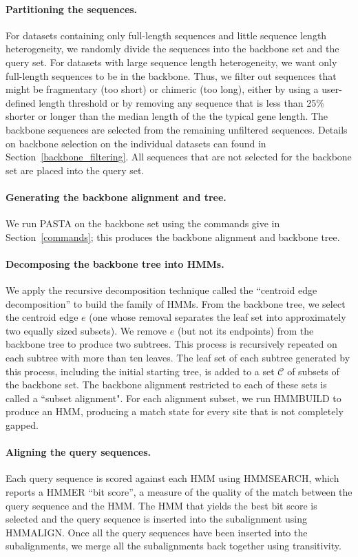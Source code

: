 \paragraph{Partitioning the sequences.}  For datasets containing only full-length sequences and little sequence length heterogeneity, we randomly divide the sequences into the backbone set and the query set.  For datasets with large sequence length heterogeneity, we want only full-length sequences to be in the backbone.  Thus, we filter out sequences that might be fragmentary (too short) or chimeric (too long), either by 
using a user-defined length threshold or by removing any sequence that 
is less than 25\% shorter or  longer than the median length of the the typical gene length.  The backbone sequences are selected from the remaining unfiltered sequences.  Details on backbone selection on the individual datasets can found in Section~\ref{backbone_filtering}.  All sequences that are not selected for the backbone set are placed into the query set.  

\paragraph{Generating the backbone alignment and tree.}  
We run PASTA on the backbone set using 
the commands give in Section~\ref{commands}; this produces the backbone alignment and backbone tree.  

\paragraph{Decomposing the backbone tree into HMMs.}  
We apply the recursive decomposition technique called the 
``centroid edge decomposition'' \cite{Liu2012} 
to build the family of HMMs.  
From the backbone tree, we select the centroid edge $e$ 
(one whose removal separates the leaf set into 
approximately two equally 
sized subsets).
We remove $e$ (but not its endpoints) from 
the backbone tree  to produce two subtrees.  
This process is recursively repeated on each subtree with
more than ten leaves.
The leaf set of each subtree generated by this process, 
including the initial starting tree, 
is added to a set $\mathcal C$ of subsets of the backbone set.
The backbone alignment restricted to each of these sets is
called a ``subset alignment".
 For each alignment subset, we run HMMBUILD to produce an HMM, producing a match state for every site that is not completely gapped.

\paragraph{Aligning the query sequences.}  Each query sequence is scored against each HMM using HMMSEARCH, which reports a HMMER ``bit score'', a measure of the quality of the match between the query sequence and the HMM.  The HMM that yields the best bit score is selected and the query sequence is inserted into the subalignment using HMMALIGN.  Once all the query sequences have been inserted into the subalignments, we merge all the subalignments back together using transitivity.  

